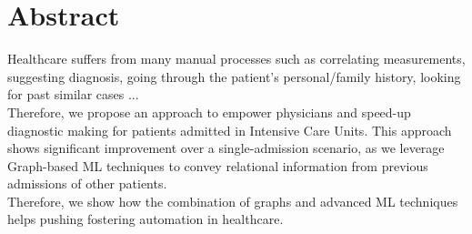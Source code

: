 \chapter{Abstract}
Healthcare suffers from many manual processes such as correlating measurements, suggesting diagnosis, going through the patient's personal/family history, looking for past similar cases ... \\
Therefore, we propose an approach to empower physicians and speed-up diagnostic making for patients admitted in Intensive Care Units. This approach shows significant improvement over a single-admission scenario, as we leverage Graph-based ML techniques to convey relational information from previous admissions of other patients. \\
Therefore, we show how the combination of graphs and advanced ML techniques helps pushing fostering automation in healthcare.